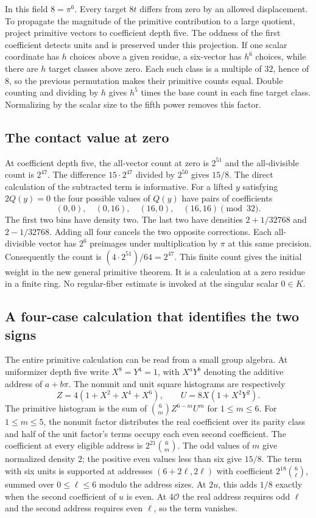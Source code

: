 \documentclass[12pt,letterpaper]{article}
\begin{document}
In this field $8=\pi^6$. Every target $8t$ differs from zero by an allowed displacement. To propagate the magnitude of the primitive contribution to a large quotient, project primitive vectors to coefficient depth five. The oddness of the first coefficient detects units and is preserved under this projection. If one scalar coordinate has $h$ choices above a given residue, a six-vector has $h^6$ choices, while there are $h$ target classes above zero. Each such class is a multiple of $32$, hence of $8$, so the previous permutation makes their primitive counts equal. Double counting and dividing by $h$ gives $h^5$ times the base count in each fine target class. Normalizing by the scalar size to the fifth power removes this factor.

\subsection{The contact value at zero}
At coefficient depth five, the all-vector count at zero is $2^{51}$ and the all-divisible count is $2^{47}$. The difference $15\cdot2^{47}$ divided by $2^{50}$ gives $15/8$. The direct calculation of the subtracted term is informative. For a lifted $y$ satisfying $2Q(y)=0$ the four possible values of $Q(y)$ have pairs of coefficients
\[
             (0,0),\quad(0,16),\quad(16,0),\quad(16,16)
                   \pmod {32}.
\]
The first two bins have density two. The last two have densities $2+1/32768$ and $2-1/32768$. Adding all four cancels the two opposite corrections. Each all-divisible vector has $2^6$ preimages under multiplication by $\pi$ at this same precision. Consequently the count is $(4\cdot2^{51})/64=2^{47}$. This finite count gives the initial weight in the new general primitive theorem. It is a calculation at a zero residue in a finite ring. No regular-fiber estimate is invoked at the singular scalar $0\in K$.


\subsection{A four-case calculation that identifies the two signs}
The entire primitive calculation can be read from a small group algebra. At uniformizer depth five write \(X^8=Y^4=1\), with \(X^aY^b\) denoting the additive address of \(a+b\pi\). The nonunit and unit square histograms are respectively
\[
 Z=4(1+X^2+X^4+X^6),\qquad U=8X(1+X^2Y^2).
\]
The primitive histogram is the sum of \(\binom6m Z^{6-m}U^m\) for \(1\leq m\leq6\). For \(1\leq m\leq5\), the nonunit factor distributes the real coefficient over its parity class and half of the unit factor's terms occupy each even second coefficient. The coefficient at every eligible address is \(2^{21}\binom6m\). The odd values of \(m\) give normalized density \(2\); the positive even values less than six give \(15/8\). The term with six units is supported at addresses \((6+2\ell,2\ell)\) with coefficient \(2^{18}\binom6\ell\), summed over \(0\leq\ell\leq6\) modulo the address sizes. At \(2u\), this adds \(1/8\) exactly when the second coefficient of \(u\) is even. At \(4\mathcal O\) the real address requires odd \(\ell\) and the second address requires even \(\ell\), so the term vanishes.
\end{document}
